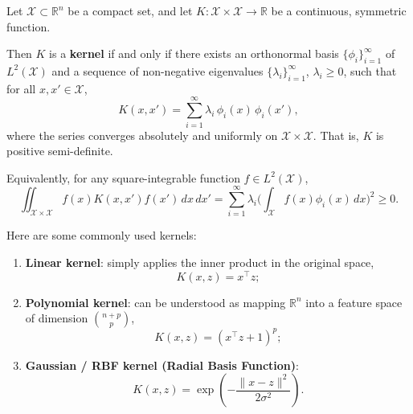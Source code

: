 \documentclass[../main]{subfiles}
\begin{document}
        \begin{theorem}
            Let $\mathcal{X} \subset \mathbb{R}^n$ be a compact set, and let 
            $K : \mathcal{X} \times \mathcal{X} \to \mathbb{R}$ 
            be a continuous, symmetric function.
            
            Then $K$ is a \textbf{kernel} 
            if and only if there exists an orthonormal basis 
            $\{\phi_i\}_{i=1}^{\infty}$ of $L^2(\mathcal{X})$ 
            and a sequence of non-negative eigenvalues 
            $\{\lambda_i\}_{i=1}^{\infty}$, $\lambda_i \ge 0$, 
            such that for all $x, x' \in \mathcal{X}$,
            \begin{equation}
                K(x, x') = \sum_{i=1}^{\infty} 
                \lambda_i\, \phi_i(x)\, \phi_i(x'),
            \end{equation}
            where the series converges absolutely and uniformly on $\mathcal{X} \times \mathcal{X}$. That is, $K$ is positive semi-definite.
            
            Equivalently, for any square-integrable function $f \in L^2(\mathcal{X})$,
            \begin{equation}
                \iint_{\mathcal{X}\times\mathcal{X}} 
                f(x) K(x, x') f(x')\,dx\,dx' 
                = \sum_{i=1}^{\infty} \lambda_i 
                  \Big(\int_{\mathcal{X}} f(x) \phi_i(x)\,dx\Big)^2
                \ge 0.
            \end{equation}
            \end{theorem}
        Here are some commonly used kernels:
        \begin{enumerate}
            \item \textbf{Linear kernel}: simply applies the inner product in the original space,
            \begin{equation}
                K(x, z) = x^\top z;
            \end{equation}
            \item \textbf{Polynomial kernel}: can be understood as mapping $\mathbb{R}^n$ into a feature space of dimension $\binom{n+p}{p}$,
            \begin{equation}
                K(x, z) = (x^\top z + 1)^p;
            \end{equation}
            \item \textbf{Gaussian / RBF kernel (Radial Basis Function)}:
            \begin{equation}
                K(x, z) = \exp\left(-\frac{\|x - z\|^2}{2\sigma^2}\right).
            \end{equation}
        \end{enumerate}
        
\end{document}
